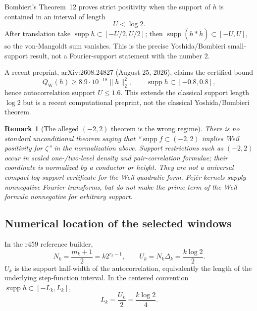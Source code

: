 \documentclass[11pt]{article}
\newtheorem{remark}{Remark}
\newcommand{\QW}{Q_{\mathrm W}}
\begin{document}
Bombieri's Theorem~12 proves strict positivity when the support
of $h$ is contained in an interval of length
\[
 U<\log2.
\]
After translation take
$\operatorname{supp}h\subset[-U/2,U/2]$; then
$\operatorname{supp}(h*\widetilde h)\subset[-U,U]$, so the
von-Mangoldt sum vanishes.  This is the precise
Yoshida/Bombieri small-support result, not a Fourier-support
statement with the number $2$.

A recent preprint, arXiv:2608.24827 (August 25, 2026), claims the
certified bound
\[
 \QW(h)\ge8.9\cdot10^{-18}\|h\|_2^2,\qquad
 \operatorname{supp}h\subset[-0.8,0.8],
\]
hence autocorrelation support $U\le1.6$.
This extends the classical support length $\log2$ but is a
recent computational preprint, not the classical
Yoshida/Bombieri theorem.

\begin{remark}[The alleged $(-2,2)$ theorem is the wrong regime]
There is no standard unconditional theorem saying that
``$\operatorname{supp}\widehat f\subset(-2,2)$ implies Weil
positivity for $\zeta$'' in the normalization above.
Support restrictions such as $(-2,2)$ occur in scaled
one-/two-level density and pair-correlation formulae; their
coordinate is normalized by a conductor or height.
They are not a universal compact-log-support certificate for
the Weil quadratic form.  Fej\'er kernels supply
nonnegative Fourier transforms, but do not make the prime term
of the Weil formula nonnegative for arbitrary support.
\end{remark}

\subsection{Numerical location of the selected windows}

In the r459 reference builder,
\[
 N_k=\frac{m_k+1}{2}=k2^{r_k-1},
\qquad U_k=N_k\Delta_k=\frac{k\log2}{2}.
\]
$U_k$ is the support half-width of the autocorrelation, equivalently
the length of the underlying step-function interval.
In the centered convention
$\operatorname{supp}h\subset[-L_k,L_k]$,
\[
 L_k=\frac{U_k}{2}=\frac{k\log2}{4}.
\]
\end{document}
